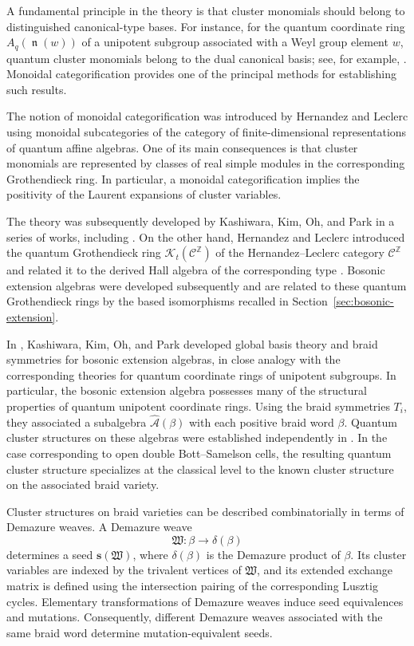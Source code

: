 \documentclass[12pt, reqno]{amsart}
\theoremstyle{plain}
\theoremstyle{definition}
\numberwithin{equation}{section}
\newcommand{\ZZ}{\mathbb{Z}}
\newcommand{\fn}{\operatorname{\mathfrak{n}}}
\newcommand{\cA}{\mathcal{A}}
\begin{document}
A fundamental principle in the theory is that cluster monomials
should belong to distinguished canonical-type bases. For instance,
for the quantum coordinate ring \(A_q(\fn(w))\) of a unipotent
subgroup associated with a Weyl group element \(w\), quantum cluster
monomials belong to the dual canonical basis; see, for example,
\cite{qin2017triangular,kang2018monoidal}. Monoidal categorification
provides one of the principal methods for establishing such results.

The notion of monoidal categorification was introduced by
Hernandez and Leclerc \cite{hernandez2010cluster} using monoidal
subcategories of the category of finite-dimensional representations
of quantum affine algebras. One of its main consequences is that
cluster monomials are represented by classes of real simple modules
in the corresponding Grothendieck ring. In particular, a monoidal
categorification implies the positivity of the Laurent expansions of
cluster variables.

The theory was subsequently developed by Kashiwara, Kim, Oh, and
Park in a series of works, including
\cite{kashiwara2024monoidal,kashiwara2025monoidal}. On the other hand,
Hernandez and Leclerc introduced the quantum Grothendieck ring
\(
    \mathcal K_t(\mathscr C^{\ZZ})
\)
of the Hernandez--Leclerc category \(\mathscr C^{\ZZ}\) and related
it to the derived Hall algebra of the corresponding type
\cite{hernandez2015quantum}. Bosonic extension algebras were developed
subsequently and are related to these quantum Grothendieck rings by
the based isomorphisms recalled in Section~\ref{sec:bosonic-extension}.

In
\cite{oh2025pbw,kashiwara2024braid,kashiwara2025global},
Kashiwara, Kim, Oh, and Park developed global basis theory and braid
symmetries for bosonic extension algebras, in close analogy with the
corresponding theories for quantum coordinate rings of unipotent
subgroups. In particular, the bosonic extension algebra possesses
many of the structural properties of quantum unipotent coordinate
rings. Using the braid symmetries \(T_i\), they associated a
subalgebra
\(    \widehat{\cA}(\beta)
\)
with each positive braid word \(\beta\). Quantum cluster structures
on these algebras were established independently in
\cite{qin2024analogs,bi2025cluster,kashiwara2025monoidal}. In the
case corresponding to open double Bott--Samelson cells, the
resulting quantum cluster structure specializes at the classical
level to the known cluster structure on the associated braid
variety.

Cluster structures on braid varieties can be described
combinatorially in terms of Demazure weaves. A Demazure weave
\[
    \mathfrak W\colon\beta\longrightarrow\delta(\beta)
\]
determines a seed \(\mathbf s(\mathfrak W)\), where $\delta(\beta)$ is the Demazure product of $\beta$. Its cluster variables
are indexed by the trivalent vertices of \(\mathfrak W\), and its
extended exchange matrix is defined using the intersection pairing
of the corresponding Lusztig cycles. Elementary transformations of
Demazure weaves induce seed  equivalences and mutations. Consequently, different
Demazure weaves associated with the same braid word determine
mutation-equivalent seeds.
\end{document}
